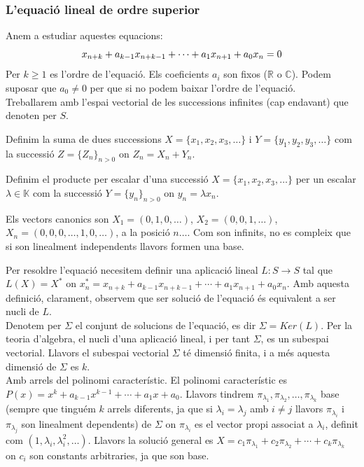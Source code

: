\documentclass[../main.tex]{subfiles}
\begin{document}
\subsubsection{L'equació lineal de ordre superior}
Anem a estudiar aquestes equacions:
\begin{displaymath}
    x_{n+k} + a_{k-1}x_{n+k-1} + \cdots + a_1x_{n+1} + a_0x_n = 0 \\
\end{displaymath}
Per $k \geq 1$ es l'ordre de l'equació. Els coeficients $a_i$ son fixos ($\mathbb{R}$ o $\mathbb{C}$).
Podem suposar que $a_0 \neq 0$ per que si no podem baixar l'ordre de l'equació.\\
Treballarem amb l'espai vectorial de les successions infinites (cap endavant) que denoten per $S$.
\begin{definicio}
    Definim la suma de dues successions $X = \{x_1, x_2, x_3, \dots\}$ i $Y = \{y_1, y_2, y_3, \dots\}$ com la successió $Z = \{Z_n\}_{n>0}$ on $Z_n = X_n + Y_n$.
\end{definicio}
\begin{definicio}
    Definim el producte per escalar d'una successió $X = \{x_1, x_2, x_3, \dots\}$ per un escalar $\lambda \in \mathbb{K}$ com la successió $Y = \{y_n\}_{n>0}$ on $y_n = \lambda x_n$.
\end{definicio}
\begin{obs}
    Els vectors canonics son $X_1 = (0, 1, 0, \dots)$, $X_2 = (0, 0, 1, \dots)$, $X_n  = (0, 0, 0, \dots, 1, 0, \dots)$, a la posició $n\dots$.
    Com son infinits, no es compleix que si son linealment independents llavors formen una base.
\end{obs}
Per resoldre l'equació necesitem definir una aplicació lineal $L: S \rightarrow S$ tal que $L(X) = X^*$ on $x^*_n = x_{n+k} + a_{k-1}x_{n+k-1} + \cdots + a_1x_{n+1} + a_0x_n$. Amb aquesta definició, clarament, observem que ser solució de l'equació és equivalent a ser nucli de $L$.\\
Denotem per $\Sigma$ el conjunt de solucions de l'equació, es dir $\Sigma = Ker(L)$. Per la teoria d'algebra, el nucli d'una aplicació lineal, i per tant $\Sigma$, es un subespai vectorial. Llavors el subespai vectorial $\Sigma$ té dimensió finita, i a més aquesta dimensió de $\Sigma$ es $k$.\\
 Amb arrels del polinomi característic. El polinomi característic es $P(x) = x^k + a_{k-1}x^{k-1} + \cdots + a_1x + a_0$. Llavors tindrem $\pi_{\lambda_1}, \pi_{\lambda_2}, \dots, \pi_{\lambda_k}$ base (sempre que tinguém $k$ arrels diferents, ja que si $\lambda_i = \lambda_j$ amb $i \neq j$ llavors $\pi_{\lambda_i}$ i $\pi_{\lambda_j}$ son linealment dependents) de $\Sigma$ on $\pi_{\lambda_i}$ es el vector propi associat a $\lambda_i$, definit com $\left(1, \lambda_i, \lambda_i^2, \dots\right)$. Llavors la solució general es $X = c_1\pi_{\lambda_1} + c_2\pi_{\lambda_2} + \cdots + c_k\pi_{\lambda_k}$ on $c_i$ son constants arbitraries, ja que son base.\\
\end{document}
